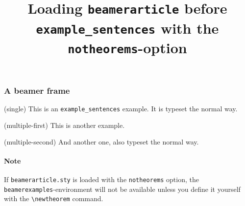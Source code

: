 \documentclass{article}
\title{Loading \texttt{beamerarticle} before \texttt{example\_sentences} with the \texttt{notheorems}-option}
\date{}
\author{}
\begin{document}
	\maketitle
	\begin{frame}
		\frametitle{A beamer frame}
		\begin{example}
			\item(single) This is an \texttt{example\_sentences} example. It is typeset the normal way.
		\end{example}
		\begin{examples}
		 	 \item(multiple-first) This is another example.
		 	 \item(multiple-second) And another one, also typeset the normal way.
		\end{examples}
	\end{frame}
    
    \paragraph{Note} If \texttt{beamerarticle.sty} is loaded with the \texttt{notheorems} option, the \texttt{beamerexamples}-environment will not be available unless you define it yourself with the
    \verb|\newtheorem| command.
\end{document}
